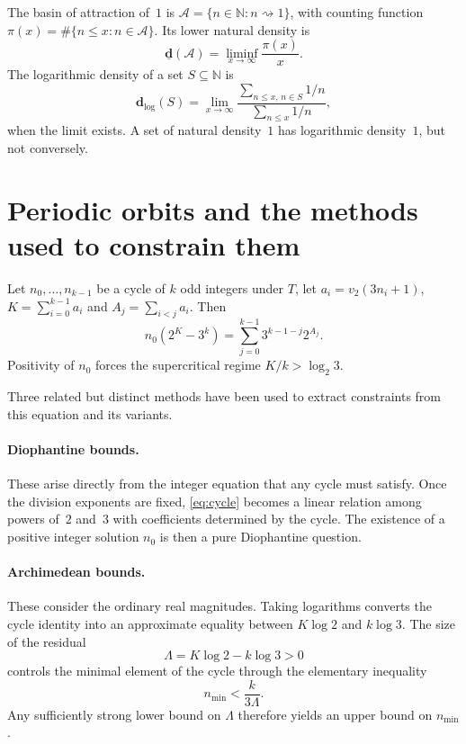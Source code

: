 \documentclass[11pt,reqno,oneside]{amsart}
\newcommand{\N}{\mathbb{N}}
\begin{document}
The basin of attraction of~$1$ is $\mathcal{A}=\{n\in\N:n\rightsquigarrow 1\}$, with counting function $\pi(x)=\#\{n\le x:n\in\mathcal{A}\}$. Its lower natural density is
\[
\underline{\mathbf{d}}(\mathcal{A})=\liminf_{x\to\infty}\frac{\pi(x)}{x}.
\]
The logarithmic density of a set $S\subseteq\N$ is
\[
\mathbf{d}_{\log}(S)=\lim_{x\to\infty}\frac{\sum_{n\le x,\,n\in S}1/n}{\sum_{n\le x}1/n},
\]
when the limit exists. A set of natural density~$1$ has logarithmic density~$1$, but not conversely.

\section{Periodic orbits and the methods used to constrain them}\label{sec:cycles}

Let $n_0,\dots,n_{k-1}$ be a cycle of $k$ odd integers under $T$, let $a_i=v_2(3n_i+1)$, $K=\sum_{i=0}^{k-1}a_i$ and $A_j=\sum_{i<j}a_i$. Then
\begin{equation}\label{eq:cycle}
n_0(2^K-3^k)=\sum_{j=0}^{k-1}3^{k-1-j}2^{A_j}.
\end{equation}
Positivity of $n_0$ forces the supercritical regime $K/k>\log_2 3$.

Three related but distinct methods have been used to extract constraints from this equation and its variants.

\paragraph{Diophantine bounds.}
These arise directly from the integer equation that any cycle must satisfy. Once the division exponents are fixed, \eqref{eq:cycle} becomes a linear relation among powers of~$2$ and~$3$ with coefficients determined by the cycle. The existence of a positive integer solution $n_0$ is then a pure Diophantine question.

\paragraph{Archimedean bounds.}
These consider the ordinary real magnitudes. Taking logarithms converts the cycle identity into an approximate equality between $K\log 2$ and $k\log 3$. The size of the residual
\[
\Lambda=K\log 2-k\log 3>0
\]
controls the minimal element of the cycle through the elementary inequality
\[
n_{\min}<\frac{k}{3\Lambda}.
\]
Any sufficiently strong lower bound on $\Lambda$ therefore yields an upper bound on $n_{\min}$.
\end{document}
